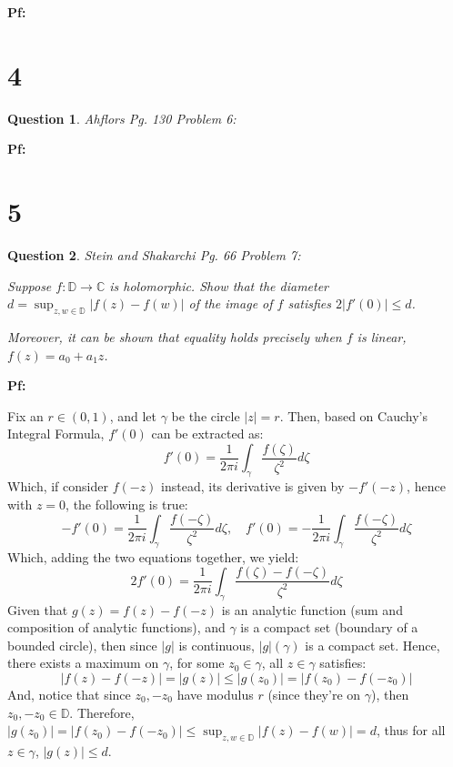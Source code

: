 \documentclass{article}
\newtheorem{question}{Question}
\begin{document}
\textbf{Pf:}

\break

\section*{4}
\begin{myBox}[]{}
    \begin{question}
        Ahflors Pg. 130 Problem 6:
    \end{question}
\end{myBox}

\textbf{Pf:}

\break

\section*{5}
\begin{myBox}[]{}
    \begin{question}
        Stein and Shakarchi Pg. 66 Problem 7:
        
        Suppose $f:\mathbb{D}\rightarrow \mathbb{C}$ is holomorphic. Show that the diameter $d=\sup_{z,w\in\mathbb{D}}|f(z)-f(w)|$ 
        of the image of $f$ satisfies $2|f'(0)| \leq d$.

        Moreover, it can be shown that equality holds precisely when $f$ is linear, $f(z) =
        a_0 + a_1z$.
    \end{question}
\end{myBox}

\textbf{Pf:}

Fix an $r\in(0,1)$, and let $\gamma$ be the circle $|z|=r$. Then, based on Cauchy's Integral Formula, $f'(0)$ can be extracted as:
$$f'(0)=\frac{1}{2\pi i}\int_{\gamma}\frac{f(\zeta)}{\zeta^2}d\zeta$$
Which, if consider $f(-z)$ instead, its derivative is given by $-f'(-z)$, hence with $z=0$, the following is true:
$$-f'(0)=\frac{1}{2\pi i}\int_{\gamma}\frac{f(-\zeta)}{\zeta^2}d\zeta,\quad f'(0)=-\frac{1}{2\pi i}\int_{\gamma}\frac{f(-\zeta)}{\zeta^2}d\zeta$$
Which, adding the two equations together, we yield:
$$2f'(0)=\frac{1}{2\pi i}\int_{\gamma}\frac{f(\zeta)-f(-\zeta)}{\zeta^2}d\zeta$$
Given that $g(z)=f(z)-f(-z)$ is an analytic function (sum and composition of analytic functions), and $\gamma$ is a compact set (boundary of a bounded circle),
then since $|g|$ is continuous, $|g|(\gamma)$ is a compact set. Hence, there exists a maximum on $\gamma$, for some $z_0\in\gamma$, all $z\in\gamma$ satisfies:
$$|f(z)-f(-z)|=|g(z)|\leq |g(z_0)|=|f(z_0)-f(-z_0)|$$
And, notice that since $z_0, -z_0$ have modulus $r$ (since they're on $\gamma$), then $z_0,-z_0\in \mathbb{D}$. Therefore,
$|g(z_0)|=|f(z_0)-f(-z_0)| \leq \sup_{z,w\in\mathbb{D}}|f(z)-f(w)| = d$, thus for all $z\in\gamma$, $|g(z)|\leq d$.
\end{document}
